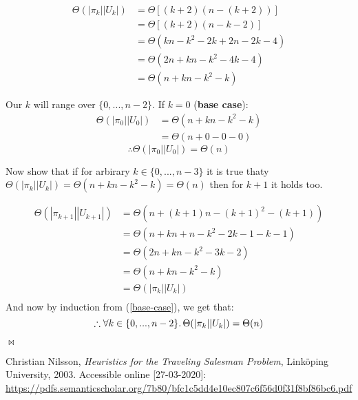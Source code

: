 \documentclass{article}
\newcommand{\qed}{\begin{flushright}$\bowtie$\end{flushright}}
\newcommand{\bb}[1]{\textbf{#1}}
\begin{document}
\begin{align*}
  \Theta(|\pi_k||U_k|) & = \Theta\left[ (k+2)(n-(k+2)) \right] \\
                       & = \Theta\left[ (k+2)(n-k-2) \right] \\
                       & = \Theta(kn - k^2 - 2k + 2n - 2k - 4) \\
                       & = \Theta(2n + kn - k^2 - 4k - 4) \\
                       & = \Theta(n + kn - k^2 - k)
\end{align*}

Our $k$ will range over $\{0,...,n-2\}$. If $k=0$ (\bb{base case}):
\begin{align*}
  \Theta(|\pi_0||U_0|) & = \Theta(n + kn - k^2 - k) \\
                       & = \Theta(n + 0 - 0 - 0)
\end{align*}
\begin{equation}
  \label{base-case}
  \therefore \Theta(|\pi_0||U_0|) = \Theta(n)
\end{equation}

Now show that if for arbirary $k\in\{0,...,n-3\}$ it is true thaty
$\Theta(|\pi_k||U_k|) = \Theta(n + kn - k^2 - k) = \Theta(n)$ then for
$k+1$ it holds too.

\begin{align*}
  \Theta(|\pi_{k+1}||U_{k+1}|) & = \Theta(n + (k+1)n - (k+1)^2 - (k+1)) \\
                               & = \Theta(n + kn + n - k^2 - 2k - 1 -k -1) \\
                               & = \Theta(2n + kn - k^2 - 3k - 2) \\
                               & = \Theta(n + kn - k^2 - k) \\
                               & = \Theta(|\pi_k||U_k|) \\
\end{align*}
And now by induction from (\ref*{base-case}), we get that:
\[ \therefore \forall k\in\{0,...,n-2\}\ldotp
  \Theta(|\pi_k||U_k|) = \Theta(n)\]
\qed



\begin{thebibliography}{9}
  Christian Nilsson,
  \textit{Heuristics for the Traveling Salesman Problem},
  Link\"oping University,
  2003.
  Accessible online [27-03-2020]: \url{https://pdfs.semanticscholar.org/7b80/bfc1c5dd4e10ec807c6f56d0f31f8bf86bc6.pdf}
\end{thebibliography}
\end{document}
